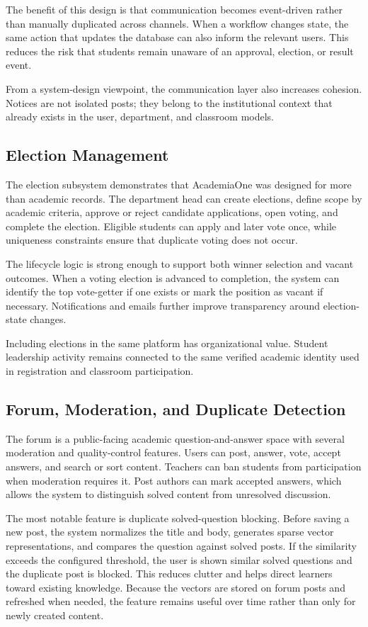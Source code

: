 \documentclass[12pt,a4paper]{report}
\newcommand{\systemName}{AcademiaOne}
\begin{document}
The benefit of this design is that communication becomes event-driven rather than manually duplicated across channels. When a workflow changes state, the same action that updates the database can also inform the relevant users. This reduces the risk that students remain unaware of an approval, election, or result event.

From a system-design viewpoint, the communication layer also increases cohesion. Notices are not isolated posts; they belong to the institutional context that already exists in the user, department, and classroom models.

\subsection{Election Management}
The election subsystem demonstrates that \systemName{} was designed for more than academic records. The department head can create elections, define scope by academic criteria, approve or reject candidate applications, open voting, and complete the election. Eligible students can apply and later vote once, while uniqueness constraints ensure that duplicate voting does not occur.

The lifecycle logic is strong enough to support both winner selection and vacant outcomes. When a voting election is advanced to completion, the system can identify the top vote-getter if one exists or mark the position as vacant if necessary. Notifications and emails further improve transparency around election-state changes.

Including elections in the same platform has organizational value. Student leadership activity remains connected to the same verified academic identity used in registration and classroom participation.

\subsection{Forum, Moderation, and Duplicate Detection}
The forum is a public-facing academic question-and-answer space with several moderation and quality-control features. Users can post, answer, vote, accept answers, and search or sort content. Teachers can ban students from participation when moderation requires it. Post authors can mark accepted answers, which allows the system to distinguish solved content from unresolved discussion.

The most notable feature is duplicate solved-question blocking. Before saving a new post, the system normalizes the title and body, generates sparse vector representations, and compares the question against solved posts. If the similarity exceeds the configured threshold, the user is shown similar solved questions and the duplicate post is blocked. This reduces clutter and helps direct learners toward existing knowledge. Because the vectors are stored on forum posts and refreshed when needed, the feature remains useful over time rather than only for newly created content.
\end{document}
